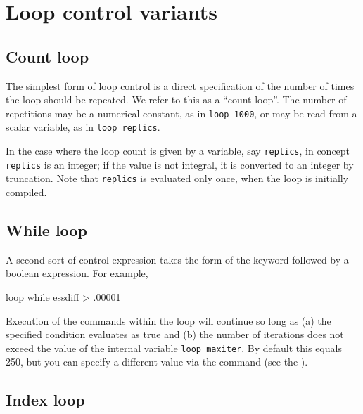 
\section{Loop control variants}
\label{loop-control}

\subsection{Count loop}
\label{loop-count}

The simplest form of loop control is a direct specification of the
number of times the loop should be repeated.  We refer to this as a
``count loop''.  The number of repetitions may be a numerical
constant, as in \verb+loop 1000+, or may be read from a scalar
variable, as in \verb+loop replics+.

In the case where the loop count is given by a variable, say
\verb+replics+, in concept \verb+replics+ is an integer; if the value
is not integral, it is converted to an integer by truncation.  Note
that \verb+replics+ is evaluated only once, when the loop is initially
compiled.
      

\subsection{While loop}
\label{loop-while}

A second sort of control expression takes the form of the keyword
 followed by a boolean expression.  For example,
%
\begin{code}
loop while essdiff > .00001
\end{code}

Execution of the commands within the loop will continue so long as (a)
the specified condition evaluates as true and (b) the number of
iterations does not exceed the value of the internal variable
\verb|loop_maxiter|.  By default this equals 250, but you can specify
a different value via the  command (see the \GCR).

\subsection{Index loop}
\label{loop-index}

